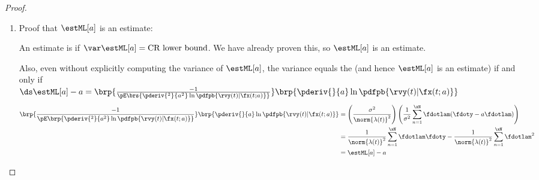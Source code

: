 \begin{proof}
\begin{enumerate}
\item Proof that $\estML[a]$ is an  estimate:

An estimate is  if
$\var\estML[a]=\mbox{CR lower bound}$.
We have already proven this, so $\estML[a]$ is an  estimate.

Also, even without explicitly computing the variance of $\estML[a]$,
the variance equals the 
(and hence $\estML[a]$ is an  estimate)
if and only if
\\\indentx$\ds\estML[a] -  a =
   \brp{\frac{-1}{\pE\brs{
              \pderiv{^2}{ a^2} \ln \pdfpb{\rvy(t)|\fx(t; a)}
           }}}
   \brp{\pderiv{}{ a} \ln \pdfpb{\rvy(t)|\fx(t; a)}}
  $
\begin{align*}
   \brp{\frac{-1}{\pE\brp{\pderiv{^2}{ a^2} \ln \pdfpb{\rvy(t)|\fx(t; a)}}}}
   \brp{\pderiv{}{ a} \ln \pdfpb{\rvy(t)|\fx(t; a)}}
     &= \left(\frac{\sigma^2}{\norm{\lambda(t)}^2}\right)
         \left(
           \frac{1}{\sigma^2} \sum_{n=1}^\xN \fdotlam( \fdoty - a \fdotlam)
         \right)
   \\&= \frac{1}{\norm{\lambda(t)}^2} \sum_{n=1}^\xN \fdotlam \fdoty -
         \frac{1}{\norm{\lambda(t)}^2} \sum_{n=1}^\xN \fdotlam^2
   \\&= \estML[a] - a
\end{align*}
\end{enumerate}
\end{proof}

